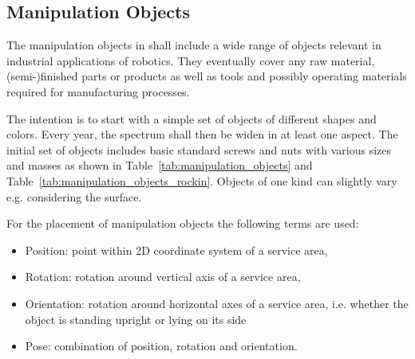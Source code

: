 \subsection{Manipulation Objects} \label{ssec:ManipulationObjects}
The manipulation objects in \RCAW shall include a wide range of objects relevant in industrial applications of robotics. They eventually cover any raw material, (semi-)finished parts or products as well as tools and possibly operating materials required for manufacturing processes.
\par
The intention is to start with a simple set of objects of different shapes and colors. Every year, the spectrum shall then be widen in at least one aspect. The initial set of objects includes basic standard screws and nuts with various sizes and masses as shown in Table~\ref{tab:manipulation_objects} and Table~\ref{tab:manipulation_objects_rockin}. Objects of one kind can slightly vary e.g. considering the surface.

For the placement of manipulation objects the following terms are used:

\begin{itemize}
\item Position: point within 2D coordinate system of a service area,
\item Rotation: rotation around vertical axis of a service area,
\item Orientation: rotation around horizontal axes of a service area, i.e. whether the object is standing upright or lying on its side
\item Pose: combination of position, rotation and orientation.
\end{itemize}

